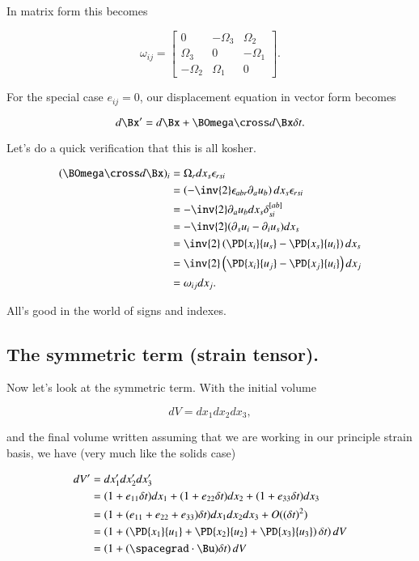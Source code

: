 In matrix form this becomes

\begin{equation}\label{eqn:continuumL9:130}
\omega_{ij} = 
\begin{bmatrix}
0 & -\Omega_3 & \Omega_2 \\
\Omega_3 & 0 & -\Omega_1  \\
-\Omega_2 & \Omega_1 & 0
\end{bmatrix}.
\end{equation}

For the special case $e_{ij} = 0$, our displacement equation in vector form becomes

\begin{equation}\label{eqn:continuumL9:150}
d\Bx' = d\Bx + \BOmega \cross d\Bx \delta t.
\end{equation}

Let's do a quick verification that this is all kosher.

\begin{align*}
(\BOmega \cross d\Bx)_i
&=
\Omega_r dx_s \epsilon_{rsi} \\
&=
\left(-\inv{2} \epsilon_{abr} \partial_a u_b \right) dx_s \epsilon_{rsi} \\
&=
-\inv{2} \partial_a u_b dx_s \delta^{[ab]}_{si} \\
&=
-\inv{2} (
\partial_s u_i
-\partial_i u_s
) dx_s  \\
&=
\inv{2} \left(
\PD{x_i}{u_s}
-\PD{x_s}{u_i}
\right) dx_s  \\
&=
\inv{2} \left(
\PD{x_i}{u_j}
-\PD{x_j}{u_i}
\right) dx_j  \\
&=
\omega_{ij} dx_j.
\end{align*}

All's good in the world of signs and indexes.

\subsection{The symmetric term (strain tensor).}

Now let's look at the symmetric term.  With the initial volume

\begin{equation}\label{eqn:continuumL9:170}
dV = dx_1 dx_2 dx_3,
\end{equation}

and the final volume written assuming that we are working in our principle strain basis, we have (very much like the solids case)

\begin{align*}
dV' 
&= dx_1' dx_2' dx_3' \\
&= 
(1 + e_{11} \delta t) dx_1
+(1 + e_{22} \delta t) dx_2
+(1 + e_{33} \delta t) dx_3
\\
&=
(1 + (e_{11} + e_{22} + e_{33}) \delta t) dx_1 dx_2 dx_3 + O((\delta t)^2) \\
&=
\left(1 + 
\left(
\PD{x_1}{u_1}
+\PD{x_2}{u_2}
+\PD{x_3}{u_3}
\right)
\delta t \right) dV \\
&=
\left(
1 + (\spacegrad \cdot \Bu) 
\delta t
\right) dV \\
\end{align*}

